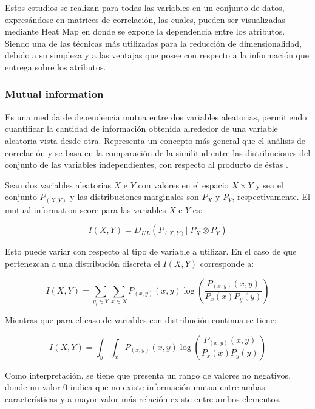 Estos estudios se realizan para todas las variables en un conjunto de datos, expresándose en matrices de correlación, las cuales, pueden ser visualizadas mediante Heat Map en donde se expone la dependencia entre los atributos. Siendo una de las técnicas más utilizadas para la reducción de dimensionalidad, debido a su simpleza y a las ventajas que posee con respecto a la información que entrega sobre los atributos.

\subsubsection{Mutual information}

Es una medida de dependencia mutua entre dos variables aleatorias, permitiendo cuantificar la cantidad de información obtenida alrededor de una variable aleatoria vista desde otra. Representa un concepto más general que el análisis de correlación y se basa en la comparación de la similitud entre las distribuciones del conjunto de las variables independientes, con respecto al producto de éstas \cite{peng2005feature}.

Sean dos variables aleatorias $X$ e $Y$ con valores en el espacio $X \times Y$ y sea el conjunto $P_{(X,Y)}$ y las distribuciones marginales son $P_X$ y $P_Y$, respectivamente. El mutual information score para las variables $X$ e $Y$ es:

\begin{equation}
	I(X,Y) = D_{KL}(P_{(X,Y)} || P_X \otimes P_Y)
\end{equation}

Esto puede variar con respecto al tipo de variable a utilizar. En el caso de que pertenezcan a una distribución discreta el $I(X,Y)$ corresponde a:

\begin{equation}
	I(X,Y) = \sum_{y_{i} \in Y} \sum_{x \in X} P_{(x,y)} (x,y) \log (\dfrac{P_{(x,y)}(x,y)}{P_{x}(x)P_{y}(y)})
\end{equation}

Mientras que para el caso de variables con distribución continua se tiene:

\begin{equation}
	I(X,Y) = \int_{y} \int_{x} P_{(x,y)} (x,y) \log (\dfrac{P_{(x,y)}(x,y)}{P_{x}(x)P_{y}(y)})
\end{equation}

Como interpretación, se tiene que presenta un rango de valores no negativos, donde un valor 0 indica que no existe información mutua entre ambas características y a mayor valor más relación existe entre ambos elementos.

